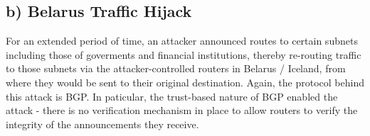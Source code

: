 \documentclass[a4paper, 11 pt, article, accentcolor=tud7b]{tudreport}
\begin{document}
	\subsection*{b) Belarus Traffic Hijack}
	For an extended period of time, an attacker announced routes to certain subnets including those of goverments and financial institutions, thereby re-routing traffic to those subnets via the attacker-controlled routers in Belarus / Iceland, from where they would be sent to their original destination. Again, the protocol behind this attack is BGP. In paticular, the trust-based nature of BGP enabled the attack - there is no verification mechanism in place to allow routers to verify the integrity of the announcements they receive.
	
\end{document}
